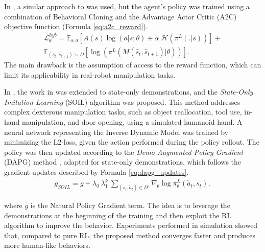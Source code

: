 In \cite{guo2019hybrid_rl}, a similar approach to \cite{torabi2018bco} was used, but the agent's policy was trained using a combination of Behavioral Cloning and the Advantage Actor Critic (A2C) objective function \cite{mnih2016a2c} (Formula \ref{eq:a2c_reward}).
\begin{equation}
    \label{eq:a2c_reward}
    \begin{aligned}
        \mathcal{L}^{hyb}_{\theta} = \mathbb{E}_{s,a} \left[ A(s)\log(a|s;\theta) + \alpha \ \mathcal{H}(\pi^{L}(.|s)) \right] 
        + \\ \mathbb{E}_{(\hat{s}_{t}, \hat{s}_{t+1}) \sim D} \left[ \log(\pi^{L}(M(\hat{s}_{t}, \hat{s}_{t+1})|\theta)) \right].
    \end{aligned}
  \end{equation}
The main drawback is the assumption of access to the reward function, which can limit its applicability in real-robot manipulation tasks.

In \cite{radosavovic2021state_only_demo}, the work in \cite{Rajeswaran18_learning_complex_dexterous} was extended to state-only demonstrations, and the \textit{State-Only Imitation Learning} (SOIL) algorithm was proposed. This method addresses complex dexterous manipulation tasks, such as object reallocation, tool use, in-hand manipulation, and door opening, using a simulated humanoid hand. A neural network representing the Inverse Dynamic Model was trained by minimizing the L2-loss, given the action performed during the policy rollout. The policy was then updated according to the \textit{Demo Augmented Policy Gradient} (DAPG) method \cite{Rajeswaran18_learning_complex_dexterous}, adapted for state-only demonstrations, which follows the gradient updates described by Formula \ref{eq:dapg_updates}.
\begin{equation}
    \label{eq:dapg_updates}
    \begin{aligned}
        g_{SOIL} = g + \lambda_{0} \ \lambda_{1}^{k} \ \sum_{(s_{t}, \tilde{a}_{t}) \in D'} \nabla_{\theta}\log\pi^{L}_{\theta}(\tilde{a}_{t}, s_{t}),
    \end{aligned}
  \end{equation}

where $g$ is the Natural Policy Gradient term. The idea is to leverage the demonstrations at the beginning of the training and then exploit the RL algorithm to improve the behavior. Experiments performed in simulation showed that, compared to pure RL, the proposed method converges faster and produces more human-like behaviors.

